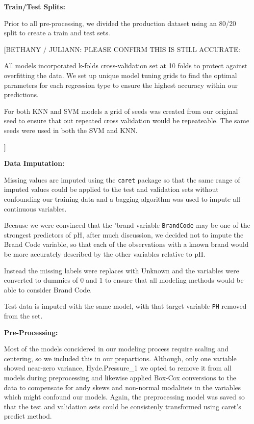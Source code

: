 \documentclass[]{report}
\begin{document}
\textbf{Train/Test Splits:}

Prior to all pre-processing, we divided the production dataset using an
80/20 split to create a train and test sets.

{[}BETHANY / JULIANN: PLEASE CONFIRM THIS IS STILL ACCURATE:

All models incorporated k-folds cross-validation set at 10 folds to
protect against overfitting the data. We set up unique model tuning
grids to find the optimal parameters for each regression type to ensure
the highest accuracy within our predictions.

For both KNN and SVM models a grid of seeds was created from our
original seed to ensure that out repeated cross validation would be
repeateable. The same seeds were used in both the SVM and KNN.

{]}

\textbf{Data Imputation:}

Missing values are imputed using the \texttt{caret} package so that the
same range of imputed values could be applied to the test and validation
sets without confounding our training data and a bagging algorithm was
used to impute all continuous variables.

Because we were convinced that the 'brand variable \texttt{BrandCode}
may be one of the strongest predictors of pH, after much discussion, we
decided not to impute the Brand Code variable, so that each of the
observations with a known brand would be more accurately described by
the other variables relative to pH.

Instead the missing labels were replaces with Unknown and the variables
were converted to dummies of 0 and 1 to ensure that all modeling methods
would be able to consider Brand Code.

Test data is imputed with the same model, with that target variable
\texttt{PH} removed from the set.

\textbf{Pre-Processing:}

Most of the models concidered in our modeling process require scaling
and centering, so we included this in our prepartions. Although, only
one variable showed near-zero variance, Hyde.Pressure\_1 we opted to
remove it from all models during preprocessing and likewise applied
Box-Cox conversions to the data to compensate for andy skews and
non-normal modaliteis in the variables which might confound our models.
Again, the preprocessing model was saved so that the test and validation
sets could be consistenly transformed using caret's predict method.
\end{document}
